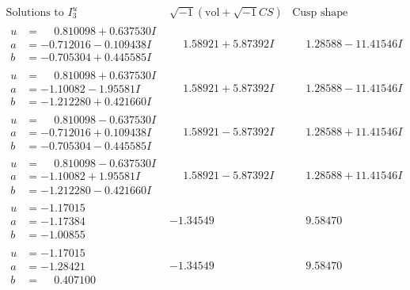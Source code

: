 \documentclass[1p]{elsarticle_modified}
\theoremstyle{definition}
\newcommand{\I}{\sqrt{-1}}
\begin{document}
$$\begin{array}{c|c|c}  
\text{Solutions to }I^u_{3}& \I (\text{vol} + \sqrt{-1}CS) & \text{Cusp shape}\\
 \hline 
\begin{aligned}
u &= \phantom{-}0.810098 + 0.637530 I \\
a &= -0.712016 - 0.109438 I \\
b &= -0.705304 + 0.445585 I\end{aligned}
 & \phantom{-}1.58921 + 5.87392 I & \phantom{-}1.28588 - 11.41546 I \\ \hline\begin{aligned}
u &= \phantom{-}0.810098 + 0.637530 I \\
a &= -1.10082 - 1.95581 I \\
b &= -1.212280 + 0.421660 I\end{aligned}
 & \phantom{-}1.58921 + 5.87392 I & \phantom{-}1.28588 - 11.41546 I \\ \hline\begin{aligned}
u &= \phantom{-}0.810098 - 0.637530 I \\
a &= -0.712016 + 0.109438 I \\
b &= -0.705304 - 0.445585 I\end{aligned}
 & \phantom{-}1.58921 - 5.87392 I & \phantom{-}1.28588 + 11.41546 I \\ \hline\begin{aligned}
u &= \phantom{-}0.810098 - 0.637530 I \\
a &= -1.10082 + 1.95581 I \\
b &= -1.212280 - 0.421660 I\end{aligned}
 & \phantom{-}1.58921 - 5.87392 I & \phantom{-}1.28588 + 11.41546 I \\ \hline\begin{aligned}
u &= -1.17015\phantom{ +0.000000I} \\
a &= -1.17384\phantom{ +0.000000I} \\
b &= -1.00855\phantom{ +0.000000I}\end{aligned}
 & -1.34549\phantom{ +0.000000I} & \phantom{-}9.58470\phantom{ +0.000000I} \\ \hline\begin{aligned}
u &= -1.17015\phantom{ +0.000000I} \\
a &= -1.28421\phantom{ +0.000000I} \\
b &= \phantom{-}0.407100\phantom{ +0.000000I}\end{aligned}
 & -1.34549\phantom{ +0.000000I} & \phantom{-}9.58470\phantom{ +0.000000I} \\ \hline\begin{aligned}

\end{aligned}
\end{array}$$
\end{document}
